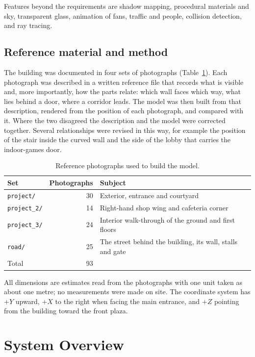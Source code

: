 \documentclass[11pt,a4paper]{article}
\newcommand{\code}[1]{\texttt{#1}}
\begin{document}
Features beyond the requirements are shadow mapping, procedural materials
and sky, transparent glass, animation of fans, traffic and people, collision
detection, and ray tracing.


\subsection{Reference material and method}
The building was documented in four sets of photographs
(Table~\ref{tab:photos}). Each photograph was described in a written
reference file that records what is visible and, more importantly, how the
parts relate: which wall faces which way, what lies behind a door, where a
corridor leads. The model was then built from that description, rendered
from the position of each photograph, and compared with it. Where the two
disagreed the description and the model were corrected together. Several
relationships were revised in this way, for example the position of the
stair inside the curved wall and the side of the lobby that carries the
indoor-games door.

\begin{table}[H]
\centering\small
\begin{tabular}{@{}lrl@{}}
\toprule
Set & Photographs & Subject \\
\midrule
\code{project/} & 30 & Exterior, entrance and courtyard \\
\code{project\_2/} & 14 & Right-hand shop wing and cafeteria corner \\
\code{project\_3/} & 24 & Interior walk-through of the ground and first floors \\
\code{road/} & 25 & The street behind the building, its wall, stalls and gate \\
\midrule
Total & 93 & \\
\bottomrule
\end{tabular}
\caption{Reference photographs used to build the model.}\label{tab:photos}
\end{table}

All dimensions are estimates read from the photographs with one unit taken
as about one metre; no measurements were made on site. The coordinate
system has $+Y$ upward, $+X$ to the right when facing the main entrance,
and $+Z$ pointing from the building toward the front plaza.

\section{System Overview}
\end{document}
